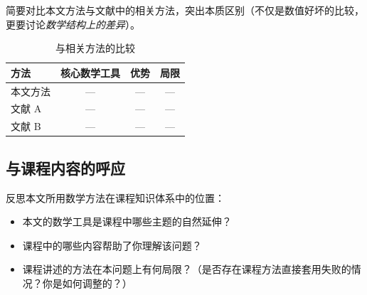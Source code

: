 简要对比本文方法与文献中的相关方法，突出本质区别（不仅是数值好坏的比较，更要讨论\emph{数学结构上的差异}）。

\begin{table}[htbp]
    \centering
    \caption{与相关方法的比较}
    \label{tab:comparison}
    \begin{tabular}{lccc}
        \toprule
        方法 & 核心数学工具 & 优势 & 局限 \\
        \midrule
        本文方法      & --- & --- & --- \\
        文献 A        & --- & --- & --- \\
        文献 B        & --- & --- & --- \\
        \bottomrule
    \end{tabular}
\end{table}

\subsection{与课程内容的呼应}

反思本文所用数学方法在课程知识体系中的位置：

\begin{itemize}
    \item 本文的数学工具是课程中哪些主题的自然延伸？
    \item 课程中的哪些内容帮助了你理解该问题？
    \item 课程讲述的方法在本问题上有何局限？（是否存在课程方法直接套用失败的情况？你是如何调整的？）
\end{itemize}
